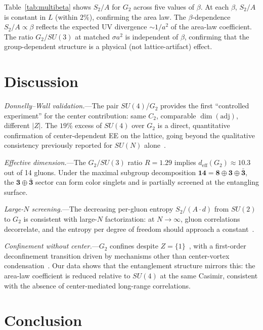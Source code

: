 \documentclass[twocolumn,prl,nofootinbib,superscriptaddress]{revtex4-2}
\begin{document}
Table~\ref{tab:multibeta} shows $S_2/A$ for $G_2$ across five values of $\beta$.  At each $\beta$, $S_2/A$ is constant in $L$ (within $2\%$), confirming the area law.  The $\beta$-dependence $S_2/A \propto \beta$ reflects the expected UV divergence $\sim 1/a^2$ of the area-law coefficient.  The ratio $G_2/SU(3)$ at matched $\sigma a^2$ is independent of $\beta$, confirming that the group-dependent structure is a physical (not lattice-artifact) effect.

\section{Discussion}

\textit{Donnelly--Wall validation.}---The pair $SU(4)$/$G_2$ provides the first ``controlled experiment'' for the center contribution: same $C_2$, comparable $\dim(\mathrm{adj})$, different $|Z|$.  The $19\%$ excess of $SU(4)$ over $G_2$ is a direct, quantitative confirmation of center-dependent EE on the lattice, going beyond the qualitative consistency previously reported for $SU(N)$ alone~\cite{Rabenstein2019}.

\textit{Effective dimension.}---The $G_2/SU(3)$ ratio $R = 1.29$ implies $d_\mathrm{eff}(G_2) \approx 10.3$ out of 14 gluons.  Under the maximal subgroup decomposition $\mathbf{14} = \mathbf{8} \oplus \mathbf{3} \oplus \bar{\mathbf{3}}$, the $\mathbf{3} \oplus \bar{\mathbf{3}}$ sector can form color singlets and is partially screened at the entangling surface.

\textit{Large-$N$ screening.}---The decreasing per-gluon entropy $S_2/(A \cdot d)$ from $SU(2)$ to $G_2$ is consistent with large-$N$ factorization: at $N \to \infty$, gluon correlations decorrelate, and the entropy per degree of freedom should approach a constant~\cite{tHooft1974}.

\textit{Confinement without center.}---$G_2$ confines despite $Z = \{1\}$~\cite{Holland2003}, with a first-order deconfinement transition driven by mechanisms other than center-vortex condensation~\cite{Bruno2015}.  Our data shows that the entanglement structure mirrors this: the area-law coefficient is reduced relative to $SU(4)$ at the same Casimir, consistent with the absence of center-mediated long-range correlations.

\section{Conclusion}
\end{document}
